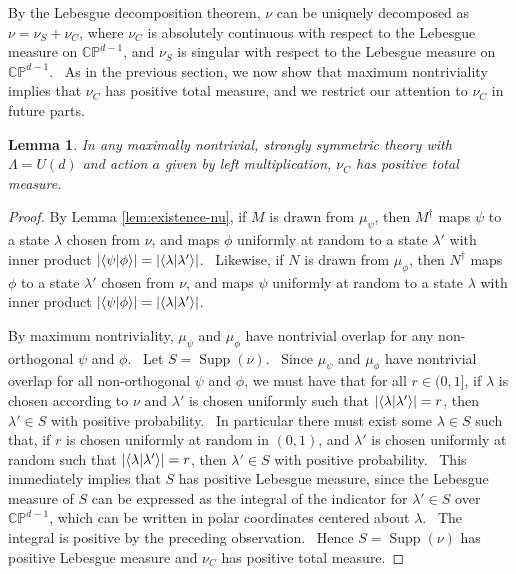 \documentclass[letterpaper,12pt]{article}
\newtheorem{lem}{Lemma}
\newcommand{\braket}[2]{\mbox{$ \langle #1 | #2 \rangle $}}
\DeclareMathOperator{\supp}{Supp}
\begin{document}
By the Lebesgue decomposition theorem, $\nu$ can be uniquely decomposed as $\nu = \nu_S + \nu_C$, where $\nu_C$ is absolutely continuous with respect to the Lebesgue measure on $\mathbb{CP}^{d-1}$, and $\nu_S$ is singular with respect to the Lebesgue measure on $\mathbb{CP}^{d-1}$. \ As in the previous section, we now show that maximum nontriviality implies that $\nu_C$ has positive total measure, and we restrict our attention to $\nu_C$ in future parts.

\begin{lem}
\label{lem:nu-C-nontrivial}
In any maximally nontrivial, strongly symmetric theory with $\Lambda=U(d)$ and action $a$ given by left multiplication, $\nu_C$ has positive total measure.

\end{lem}
\begin{proof}


By Lemma \ref{lem:existence-nu}, if $M$ is drawn from $\mu_\psi$, then $M^\dagger$ maps $\psi$ to a state $\lambda$ chosen from $\nu$, and maps $\phi$ uniformly at random to a state $\lambda'$ with inner product $|\braket{\psi}{\phi}|=|\braket{\lambda}{\lambda'}|$. \ Likewise, if $N$ is drawn from $\mu_\phi$, then $N^\dagger$ maps $\phi$ to a state $\lambda'$ chosen from $\nu$, and maps $\psi$ uniformly at random to a state $\lambda$ with inner product $|\braket{\psi}{\phi}|=|\braket{\lambda}{\lambda'}|$.

By maximum nontriviality, $\mu_\psi$ and $\mu_\phi$ have nontrivial overlap for any non-orthogonal $\psi$ and $\phi$. \ Let $S=\supp(\nu)$. \ Since $\mu_\psi$ and $\mu_\phi$ have nontrivial overlap for all non-orthogonal $\psi$ and $\phi$, we must have that for all $r\in(0,1]$, if $\lambda$ is chosen according to $\nu$ and $\lambda'$ is chosen uniformly such that $|\braket{\lambda}{\lambda'}|=r$, then $\lambda' \in S$ with positive probability. \ In particular there must exist some $\lambda \in S$ such that, if $r$ is chosen uniformly at random in $(0,1)$, and $\lambda'$ is chosen uniformly at random such that $|\braket{\lambda}{\lambda'}|=r$, then $\lambda' \in S$ with positive probability. \ This immediately implies that $S$ has positive Lebesgue measure, since the Lebesgue measure of $S$ can be expressed as the integral of the indicator for $\lambda' \in S$ over $\mathbb{CP}^{d-1}$, which can be written in polar coordinates centered about $\lambda$. \ The integral is positive by the preceding observation. \ Hence $S=\supp(\nu)$ has positive Lebesgue measure and $\nu_C$ has positive total measure.

\end{proof}
\end{document}
